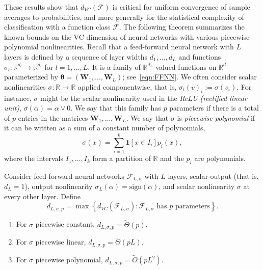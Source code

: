 These results show that $d_{VC}({\mathcal F})$ is critical for uniform convergence of sample averages to probabilities, and more generally for the statistical complexity of classification with a function class ${\mathcal F}$. The following theorem summarizes the known bounds on the VC-dimension of neural networks with various piecewise-polynomial nonlinearities. Recall that a feed-forward neural network with $L$ layers is defined by a sequence of layer widths $d_1,\ldots,d_L$ and functions
$\sigma_l: {\mathbb R}^{d_l}\to{\mathbb R}^{d_l}$ for $l=1,\ldots,L$. It is a family of ${\mathbb R}^{d_L}$-valued functions on ${\mathbb R}^d$ parameterized by ${\boldsymbol \theta}=({\boldsymbol W}_1,\ldots,{\boldsymbol W}_L)$; see~\eqref{eqn:FFNN}.
We often consider scalar nonlinearities
$\sigma:{\mathbb R}\to{\mathbb R}$ applied componentwise, that is,
$\sigma_l(v)_i:=\sigma(v_i)$.  For instance, $\sigma$ might be the scalar nonlinearity used in the {\em ReLU (rectified linear unit)},
$\sigma(\alpha)=\alpha\vee 0$.  We say that this family has $p$ parameters if there is a total of $p$ entries in the matrices
${\boldsymbol W}_1,\ldots,{\boldsymbol W}_L$. We say that $\sigma$ is {\em piecewise polynomial} if it can be written as a sum of a constant number of polynomials,
  \[
    \sigma(x) = \sum_{i=1}^k \ensuremath{\boldsymbol{1}\left[x\in I_i\right]} p_i(x),
  \]
where the intervals $I_1,\ldots,I_k$ form a partition of ${\mathbb R}$ and the $p_i$ are polynomials.

\begin{theorem}\label{thm:VCdimNNs}
Consider feed-forward neural networks ${\mathcal F}_{L,\sigma}$ with $L$ layers, scalar output (that is, $d_L=1$), output nonlinearity
$\sigma_L(\alpha)=\mathrm{sign}(\alpha)$, and scalar nonlinearity $\sigma$ at every other layer. Define
  \[
    d_{L,\sigma,p}=\max\left\{d_{VC}({\mathcal F}_{L,\sigma}) :
      \text{${\mathcal F}_{L,\sigma}$ has $p$ parameters}
    \right\}.
  \]
\begin{enumerate}
\item\label{part:NNVC:0} For $\sigma$ piecewise constant,
  $d_{L,\sigma,p}= \tilde \Theta\left(p\right)$.
\item\label{part:NNVC:1} For $\sigma$ piecewise linear,
  $d_{L,\sigma,p}= \tilde \Theta\left(pL\right)$.
\item\label{part:NNVC:2} For $\sigma$ piecewise polynomial,
  $d_{L,\sigma,p}= \tilde O\left(pL^2\right)$.
\end{enumerate}
\end{theorem}

